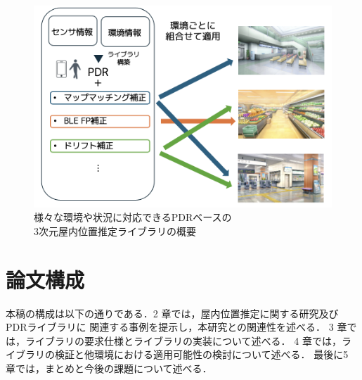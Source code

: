 \begin{figure}[h]
	\centering
	\includegraphics[width=\linewidth]{image/first.png}
	\caption{様々な環境や状況に対応できるPDRベースの\\3次元屋内位置推定ライブラリの概要}    \label{fig:overview}
\end{figure}

\section{論文構成}
本稿の構成は以下の通りである．2 章では，屋内位置推定に関する研究及びPDRライブラリに
関連する事例を提示し，本研究との関連性を述べる．
3 章では，ライブラリの要求仕様とライブラリの実装について述べる．
4 章では，ライブラリの検証と他環境における適用可能性の検討について述べる．
最後に5 章では，まとめと今後の課題について述べる．


